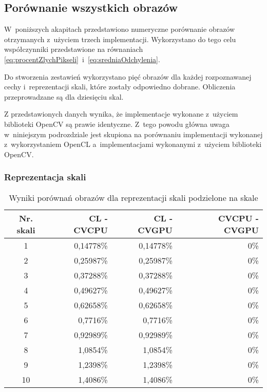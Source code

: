 \subsection{Porównanie wszystkich obrazów}
\label{subsec:porownanieNumerycznePoprawnosc}

W~poniższych akapitach przedstawiono numeryczne porównanie obrazów otrzymanych z~użyciem trzech implementacji. Wykorzystano do tego celu współczynniki przedstawione na równaniach \eqref{eq:procentZlychPikseli}~i~\eqref{eq:sredniaOdchylenia}.

Do stworzenia zestawień wykorzystano pięć obrazów dla każdej rozpoznawanej cechy i~reprezentacji skali, które zostały odpowiedno dobrane. Obliczenia przeprowadzane są dla dziesięciu skal.

Z przedstawionych danych wynika, że implementacje wykonane z~użyciem biblioteki OpenCV są prawie identyczne. Z~tego powodu główna uwaga w~niniejszym podrozdziale jest skupiona na porównaniu implementacji wykonanej z~wykorzystaniem OpenCL a~implementacjami wykonanymi z~użyciem biblioteki OpenCV.
\subsubsection{Reprezentacja skali}
\label{subsubsec:reprezentacjaSakliTabele}

\begin{center}
\begin{table}
\centering
\caption{Wyniki porównań obrazów dla reprezentacji skali podzielone na skale}
\label{tab:imageScaleRep}
\begin{tabular}{|c|r|r|r|}
 \hline
Nr. skali & CL - CVCPU & CL - CVGPU & CVCPU - CVGPU \\ \hline
1 & 0,14778\% & 0,14778\% & 0\% \\ \hline
2 & 0,25987\% & 0,25987\% & 0\% \\ \hline
3 & 0,37288\% & 0,37288\% & 0\% \\ \hline
4 & 0,49627\% & 0,49627\% & 0\% \\ \hline
5 & 0,62658\% & 0,62658\% & 0\% \\ \hline
6 & 0,7716\% & 0,7716\% & 0\% \\ \hline
7 & 0,92989\% & 0,92989\% & 0\% \\ \hline
8 & 1,0854\% & 1,0854\% & 0\% \\ \hline
9 & 1,2398\% & 1,2398\% & 0\% \\ \hline
10 & 1,4086\% & 1,4086\% & 0\% \\ \hline
\end{tabular}
\end{table}
\end{center}

